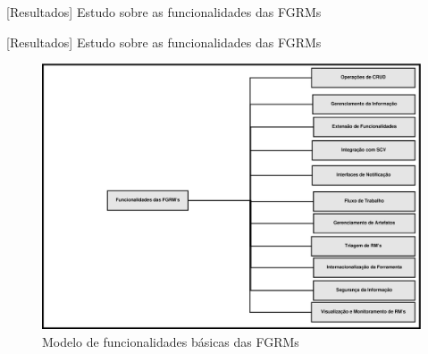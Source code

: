 \documentclass[t,14pt,mathserif]{beamer}
\begin{document}
\begin{frame}{[Resultados] Estudo sobre as funcionalidades das FGRMs}

    \begin{table}[htpb]
    \centering
    \caption{Ferramentas utilizados no estudo sobre funcionalidades das FGRMs}
\label{tab:ferramenta_utilizadas_estudo}
    \end{table}

\end{frame}

\begin{frame}{[Resultados] Estudo sobre as funcionalidades das FGRMs}

    \begin{figure}[htpb]
        \centering
        \includegraphics[width=.71\linewidth]{../img/diagrama-espectro-funcionalidades-fgrm.eps}
        \caption{Modelo de funcionalidades básicas das FGRMs}
\label{fig:diagrama-espectro-funcionalidades-fgrm}
    \end{figure}

\end{frame}
\end{document}
